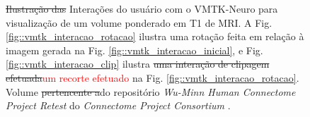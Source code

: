 \begin{figure}[htb]
{{    \label{fig::vmtk_interacao_clip}
    }
    }
    \caption{\sout{Ilustração das }Interações do usuário com o VMTK-Neuro para visualização de um volume ponderado em T1 de MRI. A Fig. \ref{fig::vmtk_interacao_rotacao} ilustra uma rotação feita em relação à imagem gerada na Fig. \ref{fig::vmtk_interacao_inicial}, e Fig. \ref{fig::vmtk_interacao_clip} ilustra \sout{uma interação de clipagem efetuada}\textcolor{red}{um recorte efetuado} na Fig. \ref{fig::vmtk_interacao_rotacao}. Volume \sout{pertencente a}do repositório \textit{Wu-Minn Human Connectome Project Retest} do \textit{Connectome Project Consortium} \cite{essen2012}.
    }
    \label{fig::vmtk_interacao}
\end{figure}
 






